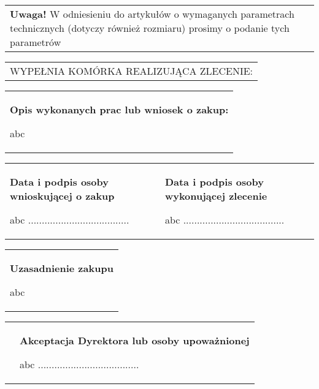 \documentclass[11pt,a4paper]{article}
\begin{document}
\begin{tabularx}{\linewidth}{|X|}
{\tiny \textbf{Uwaga!} W odniesieniu do artykułów o wymaganych parametrach technicznych (dotyczy również rozmiaru) prosimy o podanie tych parametrów}
\end{tabularx}

\begin{tabularx}{\linewidth}{|X|}
\hline
\rowcolor[gray]{.7}
WYPEŁNIA KOMÓRKA REALIZUJĄCA ZLECENIE:
\end{tabularx}

\begin{tabularx}{\linewidth}{|X|}
\hline
{\footnotesize \textbf{Opis wykonanych prac lub wniosek o zakup:}}\newline

abc 

\\
\end{tabularx}

\begin{tabularx}{\linewidth}{|X|X|}
\hline
{\footnotesize \textbf{Data i podpis osoby wnioskującej o zakup}} \newline

abc \hspace{1cm} .....................................

&
{\footnotesize \textbf{Data i podpis osoby wykonującej zlecenie}} \newline

abc \hspace{1cm} .....................................


\end{tabularx}



\begin{tabularx}{\linewidth}{|X|}
\hline

{\footnotesize \textbf{Uzasadnienie zakupu}}\newline

abc  

\end{tabularx}

\begin{tabularx}{\linewidth}{|X X|}

&  
{\footnotesize \textbf{Akceptacja Dyrektora lub osoby upoważnionej}}\newline

abc \hspace{1cm} .....................................


\\ 
\end{tabularx}
\end{document}

